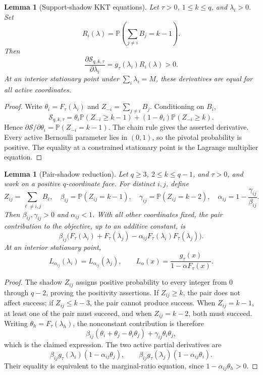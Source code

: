 \documentclass[11pt]{article}
\newtheorem{lemma}[theorem]{Lemma}
\theoremstyle{definition}
\theoremstyle{remark}
\newcommand{\Pbb}{\mathbb P}
\newcommand{\1}{\mathbf 1}
\begin{document}
\begin{lemma}[Support-shadow KKT equations]
\label{lem:support-shadow-kkt-general}
Let \(\tau>0\), \(1\le k\le q\), and \(\lambda_i>0\).  Set
\[
  R_i(\lambda)=\Pbb\left(\sum_{j\ne i}B_j=k-1\right).
\]
Then
\[
  \frac{\partial\mathcal S_{q,k,\tau}}{\partial\lambda_i}
  =g_\tau(\lambda_i)R_i(\lambda)>0.
\]
At an interior stationary point under \(\sum_i\lambda_i=M\), these derivatives are equal for all active coordinates.
\end{lemma}

\begin{proof}
Write \(\theta_i=F_\tau(\lambda_i)\) and \(Z_{-i}=\sum_{j\ne i}B_j\).  Conditioning on \(B_i\),
\[
  \mathcal S_{q,k,\tau}
  =\theta_i\Pbb(Z_{-i}\ge k-1)
    +(1-\theta_i)\Pbb(Z_{-i}\ge k).
\]
Hence \(\partial\mathcal S/\partial\theta_i=\Pbb(Z_{-i}=k-1)\).  The chain rule gives the asserted derivative.  Every active Bernoulli parameter lies in \((0,1)\), so the pivotal probability is positive.  The equality at a constrained stationary point is the Lagrange multiplier equation.
\end{proof}

\begin{lemma}[Pair-shadow reduction]
\label{lem:pair-shadow-reduction}
Let \(q\ge3\), \(2\le k\le q-1\), and \(\tau>0\), and work on a positive \(q\)-coordinate face.  For distinct \(i,j\), define
\[
  Z_{ij}=\sum_{\ell\ne i,j}B_\ell,
  \quad
  \beta_{ij}=\Pbb(Z_{ij}=k-1),
  \quad
  \gamma_{ij}=\Pbb(Z_{ij}=k-2),
  \quad
  \alpha_{ij}=1-\frac{\gamma_{ij}}{\beta_{ij}}.
\]
Then \(\beta_{ij},\gamma_{ij}>0\) and \(\alpha_{ij}<1\).  With all other coordinates fixed, the pair contribution to the objective, up to an additive constant, is
\[
  \beta_{ij}\bigl(F_\tau(\lambda_i)+F_\tau(\lambda_j)
                -\alpha_{ij}F_\tau(\lambda_i)F_\tau(\lambda_j)\bigr).
\]
At an interior stationary point,
\[
  L_{\alpha_{ij}}(\lambda_i)=L_{\alpha_{ij}}(\lambda_j),
  \qquad
  L_\alpha(x)=\frac{g_\tau(x)}{1-\alpha F_\tau(x)}.
\]
\end{lemma}

\begin{proof}
The shadow \(Z_{ij}\) assigns positive probability to every integer from \(0\) through \(q-2\), proving the positivity assertions.  If \(Z_{ij}\ge k\), the pair does not affect success; if \(Z_{ij}\le k-3\), the pair cannot produce success.  When \(Z_{ij}=k-1\), at least one of the pair must succeed, and when \(Z_{ij}=k-2\), both must succeed.  Writing \(\theta_h=F_\tau(\lambda_h)\), the nonconstant contribution is therefore
\[
  \beta_{ij}(\theta_i+\theta_j-\theta_i\theta_j)
  +\gamma_{ij}\theta_i\theta_j,
\]
which is the claimed expression.  The two active partial derivatives are
\[
  \beta_{ij}g_\tau(\lambda_i)(1-\alpha_{ij}\theta_j),
  \qquad
  \beta_{ij}g_\tau(\lambda_j)(1-\alpha_{ij}\theta_i).
\]
Their equality is equivalent to the marginal-ratio equation, since
\(1-\alpha_{ij}\theta_h>0\).
\end{proof}
\end{document}

